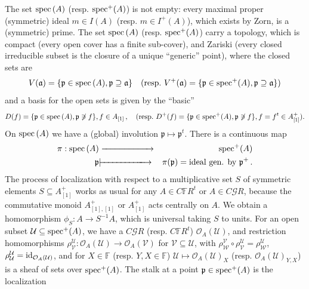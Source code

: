 \documentclass[leqno]{article}
\numberwithin{equation}{section}
\begin{document}
The set ${\rm spec} \, (A)$ (resp. ${\rm spec}^+ (A)$) is not empty: every maximal proper (symmetric) ideal $m \in I(A)$ (resp. $m \in I^+ (A)$), which exists by Zorn, is a (symmetric) prime. The set ${\rm spec} \, (A)$ (resp. ${\rm spec}^+ (A)$) carry a topology, which is compact (every open cover has a finite sub-cover), and Zariski (every closed irreducible subset is the closure of a unique ``generic'' point), where the closed sets are
\setcounter{equation}{4}
\begin{equation}
\label{eq85}
V({\mathfrak a}) = \{ {\mathfrak p} \in {\rm spec} \, (A) , {\mathfrak p} \supseteq {\mathfrak a}\} \quad \mbox{(resp.} \ V^+ ({\mathfrak a}) = \{{\mathfrak p} \in {\rm spec}^+ (A) , {\mathfrak p} \supseteq {\mathfrak a}\})
\end{equation}
and a basis for the open sets is given by the ``basic''
\begin{equation}
\label{eq86}
D(f) = \{{\mathfrak p} \in {\rm spec} \, (A) , {\mathfrak p} \not\ni f \} , f \in A_{[1]} \, , \quad \mbox{(resp.} \ D^+ (f) = \{ {\mathfrak p} \in {\rm spec}^+ (A) , {\mathfrak p} \not\ni f \} , f = f^t \in A_{[1]}^+).
\end{equation}
On ${\rm spec} \, (A)$ we have a (global) involution ${\mathfrak p} \mapsto {\mathfrak p}^t$. There is a continuous map
\begin{eqnarray}
\label{eq87}
\pi : {\rm spec} \, (A) &\xrightarrow{ \ \ \ \ \ \ \ \ \ \ \ \ \ \ \ \ \ } &{\rm spec}^+ (A) \\
{\mathfrak p} &|\!\!\!-\!\!\!-\!\!\!-\!\!\!-\!\!\!-\!\!\!-\!\!\!-\!\!\!-\!\!\!-\!\!\!-\!\!\!-\!\!\!\rightarrow &\pi ({\mathfrak p}) = \mbox{ideal gen. by} \ {\mathfrak p}^+ \, . \nonumber
\end{eqnarray}
The process of localization with respect to a multiplicative set $S$ of symmetric elements $S \subseteq A_{[1]}^+$ works as usual for any $A \in C{\mathbb F} R^t$ or $A \in C {\mathcal G} R$, because the commutative monoid $A_{[1],[1]}^+$ or $A_{[1]}^+$ acts centrally on $A$. We obtain a homomorphism $\phi_S : A \to S^{-1} A$, which is universal taking $S$ to units. For an open subset ${\mathcal U} \subseteq {\rm spec}^+ (A)$, we have a $C {\mathcal G} R$ (resp. $C{\mathbb F} R^t$) ${\mathcal O}_A ({\mathcal U})$, and restriction homomorphisms $\rho_{\mathcal V}^{\mathcal U} : {\mathcal O}_A ({\mathcal U}) \to {\mathcal O}_A ({\mathcal V})$ for ${\mathcal V} \subseteq {\mathcal U}$, with $\rho_{\mathcal W}^{\mathcal V} \circ \rho_{\mathcal V}^{\mathcal U} = \rho_{\mathcal W}^{\mathcal U}$, $\rho_{\mathcal U}^{\mathcal U} = {\rm id}_{{\mathcal O}_A ({\mathcal U})}$, and for $X \in {\mathbb F}$ (resp. $Y,X \in {\mathbb F}$) ${\mathcal U} \mapsto {\mathcal O}_A ({\mathcal U})_X$ (resp. ${\mathcal O}_A ({\mathcal U})_{Y,X}$) is a sheaf of sets over ${\rm spec}^+ (A)$. The stalk at a point ${\mathfrak p} \in {\rm spec}^+ (A)$ is the localization
\end{document}
